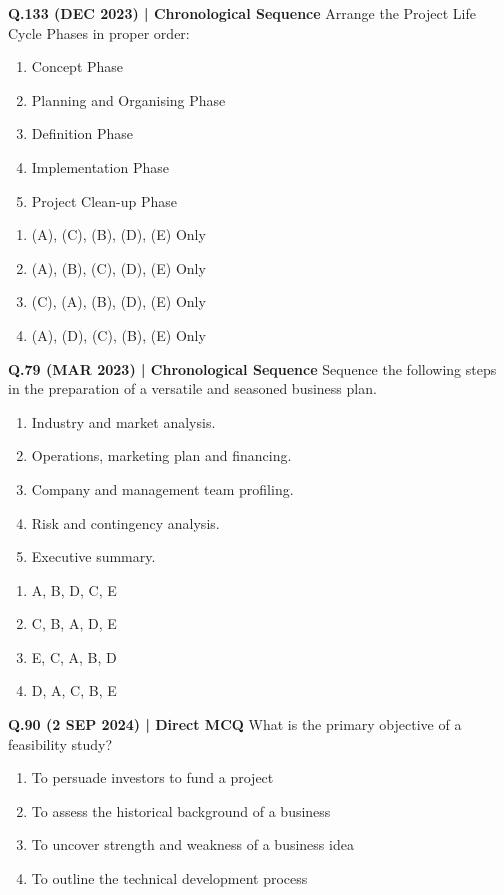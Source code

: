 \documentclass{article}
\begin{document}
\textbf{Q.133 (DEC 2023) | Chronological Sequence}
Arrange the Project Life Cycle Phases in proper order:
\begin{enumerate}[label=\Alph*.]
    \item Concept Phase
    \item Planning and Organising Phase
    \item Definition Phase
    \item Implementation Phase
    \item Project Clean-up Phase
\end{enumerate}
\begin{enumerate}[label=(\arabic*)]
    \item (A), (C), (B), (D), (E) Only
    \item (A), (B), (C), (D), (E) Only
    \item (C), (A), (B), (D), (E) Only
    \item (A), (D), (C), (B), (E) Only
\end{enumerate}

\textbf{Q.79 (MAR 2023) | Chronological Sequence}
Sequence the following steps in the preparation of a versatile and seasoned business plan.
\begin{enumerate}[label=\Alph*.]
    \item Industry and market analysis.
    \item Operations, marketing plan and financing.
    \item Company and management team profiling.
    \item Risk and contingency analysis.
    \item Executive summary.
\end{enumerate}
\begin{enumerate}[label=(\arabic*)]
    \item A, B, D, C, E
    \item C, B, A, D, E
    \item E, C, A, B, D
    \item D, A, C, B, E
\end{enumerate}

\textbf{Q.90 (2 SEP 2024) | Direct MCQ}
What is the primary objective of a feasibility study?
\begin{enumerate}[label=(\arabic*)]
    \item To persuade investors to fund a project
    \item To assess the historical background of a business
    \item To uncover strength and weakness of a business idea
    \item To outline the technical development process
\end{enumerate}
\end{document}
